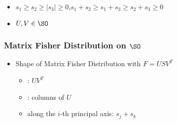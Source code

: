 \begin{frame}
\begin{itemize}
{	\begin{itemize}
	\item $s_1\geq s_2\geq |s_3|\geq 0$,\quad $s_1+s_2\geq s_1+s_3\geq s_2+s_3\geq 0$
	\item $U,V\in\SO$
	\end{itemize}}
		
\end{itemize}
\end{frame}

\begin{frame}
\frametitle{Matrix Fisher Distribution on $\SO$}
\begin{itemize}
\item Shape of Matrix Fisher Distribution with $F=USV^T$
	\begin{itemize}
	\item {} : $UV^T$
	\item {} : columns of $U$
	\item {} along the $i$-th principal axis: $s_j+s_k$
	\end{itemize}
\vspace*{0.3cm}\pause
\end{itemize}
\vspace*{-0.3cm}
\begin{columns}[t]
\begin{column}{0.32\textwidth}
\end{column}
\end{columns}
\end{frame}
